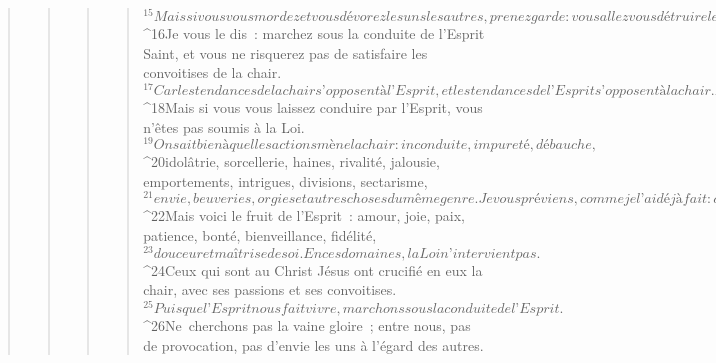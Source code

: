 \begin{verse}
\begin{verse}
\begin{verse}
\begin{verse}
${}^{15}Mais si vous vous mordez et vous dévorez les uns les autres, prenez garde : vous allez vous détruire les uns les autres. 
${}^{16}Je vous le dis : marchez sous la conduite de l’Esprit Saint, et vous ne risquerez pas de satisfaire les convoitises de la chair. 
${}^{17}Car les tendances de la chair s’opposent à l’Esprit, et les tendances de l’Esprit s’opposent à la chair. En effet, il y a là un affrontement qui vous empêche de faire tout ce que vous voudriez. 
${}^{18}Mais si vous vous laissez conduire par l’Esprit, vous n’êtes pas soumis à la Loi.
${}^{19}On sait bien à quelles actions mène la chair : inconduite, impureté, débauche, 
${}^{20}idolâtrie, sorcellerie, haines, rivalité, jalousie, emportements, intrigues, divisions, sectarisme, 
${}^{21}envie, beuveries, orgies et autres choses du même genre. Je vous préviens, comme je l’ai déjà fait : ceux qui commettent de telles actions ne recevront pas en héritage le royaume de Dieu. 
${}^{22}Mais voici le fruit de l’Esprit : amour, joie, paix, patience, bonté, bienveillance, fidélité, 
${}^{23}douceur et maîtrise de soi. En ces domaines, la Loi n’intervient pas. 
${}^{24}Ceux qui sont au Christ Jésus ont crucifié en eux la chair, avec ses passions et ses convoitises. 
${}^{25}Puisque l’Esprit nous fait vivre, marchons sous la conduite de l’Esprit. 
${}^{26}Ne cherchons pas la vaine gloire ; entre nous, pas de provocation, pas d’envie les uns à l’égard des autres.
      

\end{verse}
\end{verse}
\end{verse}
\end{verse}
